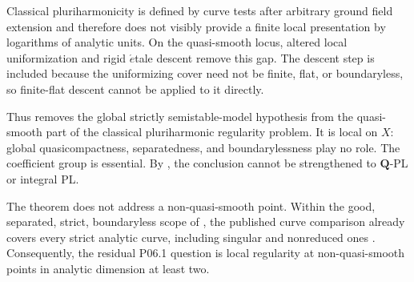%

Classical pluriharmonicity is defined by curve tests after arbitrary ground
field extension and therefore does not visibly provide a finite local
presentation by logarithms of analytic units.  On the quasi-smooth locus,
altered local uniformization and rigid \(\acute{e}\)tale descent remove this
gap.  The descent step is included because the uniformizing cover need not be
finite, flat, or boundaryless, so finite-flat descent cannot be applied to it
directly.




Thus  removes the global strictly
semistable-model hypothesis from the quasi-smooth part of the classical
pluriharmonic regularity problem.  It is local on \(X\): global
quasicompactness, separatedness, and boundarylessness play no role.  The
coefficient group is essential.  By
, the conclusion cannot be
strengthened to \(\mathbf Q\)-PL or integral PL.

The theorem does not address a non-quasi-smooth point.  Within the good,
separated, strict, boundaryless scope of
, the published curve comparison already
covers every strict analytic curve, including singular and nonreduced ones
\cite[\S4.1.2 and Proposition~3.15]{GR25Classical}.  Consequently, the
residual P06.1 question is local regularity at non-quasi-smooth points in
analytic dimension at least two.
